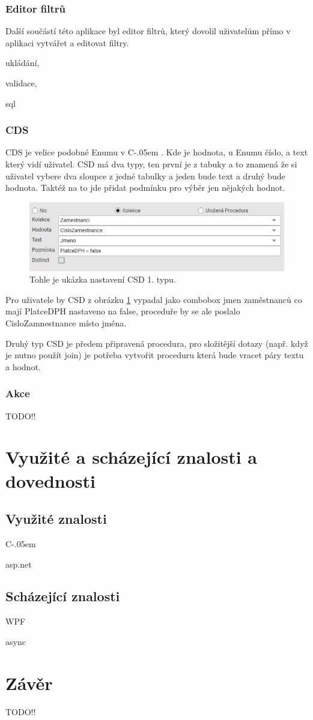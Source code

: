 \documentclass[czech,bachelor,dept460,male,csharp]{diploma}
\newcommand{\Csharp}{%
  {\settoheight{\dimen0}{C}C\kern-.05em \resizebox{!}{\dimen0}{\raisebox{\depth}{\#}}}}
\begin{document}
		\subsubsection{Editor filtrů}
			Další součástí této aplikace byl editor filtrů, který dovolil uživatelům přímo v aplikaci vytvářet a editovat filtry. 
			
			ukládání,
			
			validace, 
			
			sql		
		\subsubsection{CDS}
			CDS je velice podobné Enumu v \Csharp. Kde je hodnota, u Enumu číslo, a text který vidí uživatel. CSD má dva typy, ten první je z tabuky a to znamená že si uživatel vybere dva sloupce z jedné tabulky a jeden bude text a druhý bude hodnota. Taktéž na to jde přidat podmínku pro výběr jen nějakých hodnot.
			\begin{figure}[h]
				\includegraphics{Figures/cds.png}
				\caption{Tohle je ukázka nastavení CSD 1. typu.}
    			\label{fig:CSDimg}
			\end{figure}
			
			Pro uživatele by CSD z obrázku \ref{fig:CSDimg} vypadal jako combobox jmen zaměstnanců co mají PlatceDPH nastaveno na false, proceduře by se ale poslalo CisloZamnestnance místo jména.
			
			Druhý typ CSD je předem připravená procedura, pro složitější dotazy (např. když je nutno použít join) je potřeba vytvořit proceduru která bude vracet páry textu a hodnot.
		\subsubsection{Akce}
			TODO!!
			
\section{Využité a scházející znalosti a dovednosti}
	\subsection{Využité znalosti}
		\Csharp
		
		asp.net
	\subsection{Scházející znalosti}
		WPF 
		
		async
		
\section{Závěr}
TODO!!


\printbibliography[title={Literatura}, heading=bibintoc]


\end{document}
